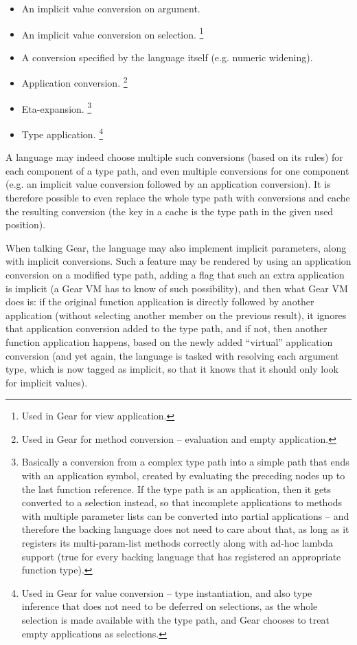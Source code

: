 \begin{itemize}
\item An implicit value conversion on argument. 
\item An implicit value conversion on selection. \footnote{Used in Gear for view application.}
\item A conversion specified by the language itself (e.g. numeric widening). 
\item Application conversion. \footnote{Used in Gear for method conversion -- evaluation and empty application.}
\item Eta-expansion. \footnote{Basically a conversion from a complex type path into a simple path that ends with an application symbol, created by evaluating the preceding nodes up to the last function reference. If the type path is an application, then it gets converted to a selection instead, so that incomplete applications to methods with multiple parameter lists can be converted into partial applications -- and therefore the backing language does not need to care about that, as long as it registers its multi-param-list methods correctly along with ad-hoc lambda support (true for every backing language that has registered an appropriate function type).}
\item Type application. \footnote{Used in Gear for value conversion -- type instantiation, and also type inference that does not need to be deferred on selections, as the whole selection is made available with the type path, and Gear chooses to treat empty applications as selections.}
\end{itemize}

A language may indeed choose multiple such conversions (based on its rules) for each component of a type path, and even multiple conversions for one component (e.g. an implicit value conversion followed by an application conversion). It is therefore possible to even replace the whole type path with conversions and cache the resulting conversion (the key in a cache is the type path in the given used position). 

When talking Gear, the language may also implement implicit parameters, along with implicit conversions. Such a feature may be rendered by using an application conversion on a modified type path, adding a flag that such an extra application is implicit (a Gear VM has to know of such possibility), and then what Gear VM does is: if the original function application is directly followed by another application (without selecting another member on the previous result), it ignores that application conversion added to the type path, and if not, then another function application happens, based on the newly added ``virtual'' application conversion (and yet again, the language is tasked with resolving each argument type, which is now tagged as implicit, so that it knows that it should only look for implicit values). 






